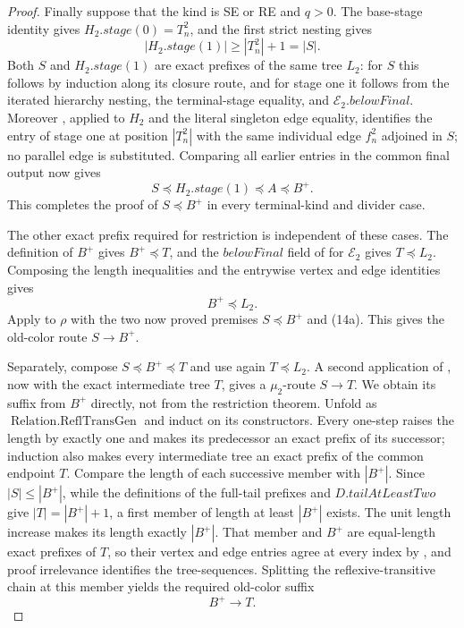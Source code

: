 \begin{proof}
Finally suppose that the kind is SE or RE and \(q>0\).  The base-stage
identity gives \(H_2.\mathit{stage}(0)=T_n^2\), and the first strict
nesting gives
\[
 |H_2.\mathit{stage}(1)|\geq |T_n^2|+1=|S|.
\]
Both \(S\) and \(H_2.\mathit{stage}(1)\) are exact prefixes of the same
tree \(L_2\): for \(S\) this follows by induction along its closure
route, and for stage one it follows from the iterated hierarchy nesting,
the terminal-stage equality, and
\(\mathcal E_2.\mathit{belowFinal}\).  Moreover
, applied to \(H_2\) and the
literal singleton edge equality, identifies the entry of stage one at
position \(|T_n^2|\) with the same individual edge \(f_n^2\) adjoined in
\(S\); no parallel edge is substituted.  Comparing all earlier entries
in the common final output now gives
\[
 S\preccurlyeq H_2.\mathit{stage}(1)
       \preccurlyeq A\preccurlyeq B^+.
\]
This completes the proof of \(S\preccurlyeq B^+\) in every terminal-kind
and divider case.

The other exact prefix required for restriction is independent of these
cases.  The definition of \(B^+\) gives \(B^+\preccurlyeq T\), and the
\(\mathit{belowFinal}\) field of
 for \(\mathcal E_2\) gives
\(T\preccurlyeq L_2\).  Composing the length inequalities and the
entrywise vertex and edge identities gives
\[
                         B^+\preccurlyeq L_2.                  \tag{14a}
\]
Apply  to \(\rho\) with
the two now proved premises \(S\preccurlyeq B^+\) and (14a).  This gives
the old-color route \(S\longrightarrow B^+\).

Separately, compose \(S\preccurlyeq B^+\preccurlyeq T\) and use again
\(T\preccurlyeq L_2\).  A second application of
, now with the exact
intermediate tree \(T\), gives a \(\mu_2\)-route
\(S\longrightarrow T\).  We obtain its suffix from \(B^+\) directly,
not from the restriction theorem.  Unfold
 as
\(\operatorname{Relation.ReflTransGen}\) and induct on its constructors.
Every one-step  raises the length by
exactly one and makes its predecessor an exact prefix of its successor;
induction also makes every intermediate tree an exact prefix of the
common endpoint \(T\).  Compare the length of each successive member
with \(|B^+|\).  Since \(|S|\leq|B^+|\), while the definitions of the
full-tail prefixes and \(D.\mathit{tailAtLeastTwo}\) give
\(|T|=|B^+|+1\), a first member of length at least \(|B^+|\) exists.
The unit length increase makes its length exactly \(|B^+|\).  That member
and \(B^+\) are equal-length exact prefixes of \(T\), so their vertex and
edge entries agree at every index by
, and proof irrelevance identifies
the tree-sequences.  Splitting the reflexive-transitive chain at this
member yields the required old-color suffix
\[
                         B^+\longrightarrow T.                \tag{14b}
\]


\end{proof}
